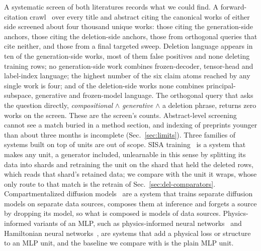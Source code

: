\documentclass{article} %
\begin{document}
A systematic screen of both literatures records what we could find. A forward-citation
crawl~\citep{priem_openalex_2022} over every title and abstract citing the canonical works of either side screened
about four thousand unique works: those citing the generation-side anchors, those citing the
deletion-side anchors, those from orthogonal queries that cite neither, and those from
a final targeted sweep. %
Deletion language appears in ten of the generation-side works, most of them
false positives and none deleting training rows; no generation-side work combines frozen-decoder,
tensor-head and label-index language; the highest number of the six claim
atoms reached by any single work is four; and of the deletion-side works none combines
principal-subspace, generative and frozen-model language. %
The orthogonal query that asks the question directly, \emph{compositional} $\wedge$
\emph{generative} $\wedge$ a deletion phrase, returns zero works on the screen.
These are the screen's counts. Abstract-level screening
cannot see a match buried in a method section, and indexing of preprints younger than about
three months is incomplete (Sec.~\ref{sec:limits}).
Three families of systems built on top of units are out of scope.
SISA training~\citep{bourtoule_machine_2021} is a system that makes any unit, a generator included,
unlearnable in this sense by splitting its data into shards and retraining the unit on the shard that
held the deleted rows, which reads that shard's retained data; we compare with the unit it wraps,
whose only route to that match is the retrain of Sec.~\ref{sec:del-comparators}.
Compartmentalized diffusion models~\citep{golatkar_training_2024} are a system that
trains separate diffusion models on separate data sources, composes them at inference and forgets
a source by dropping its model, so what is composed is models of data sources.
Physics-informed variants of an MLP, such as physics-informed neural
networks~\citep{raissi_physics-informed_2019} and Hamiltonian neural networks~\citep{greydanus_hamiltonian_2019}, are
systems that add a physical loss or structure to an MLP unit, and the baseline we compare with is the
plain MLP unit.
\end{document}
